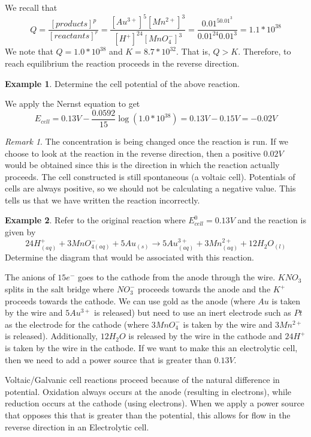 \documentclass[11pt]{article}
\theoremstyle{plain} %
\theoremstyle{definition}
\theoremstyle{example}
\newtheorem*{example}{Example}
\theoremstyle{remark}
\newtheorem*{remark}{Remark}
\begin{document}
We recall that $$Q = \frac{[products]^p}{[reactants]^r} = \frac{\left[Au^{3+}\right]^5\left[Mn^{2+}\right]^3}{\left[H^{+}\right]^{24}\left[MnO_4^-\right]^3} = \frac{0.01^50.01^3}{0.01^{24} 0.01^3} = 1.1*10^{38}$$
We note that $Q  = 1.0*10^{38}$ and $K = 8.7*10^{32}$. That is, $Q > K$. Therefore, to reach equilibrium the reaction proceeds in the reverse direction. 

\begin{example}
Determine the cell potential of the above reaction. 
\end{example}
We apply the Nernst equation to get $$E_{cell} =0.13V - \frac{0.0592}{15}\log(1.0*10^{38}) = 0.13V-0.15V = -0.02V$$

\begin{remark}The concentration is being changed once the reaction is run. If we choose to look at the reaction in the reverse direction, then a positive $0.02V$ would be obtained since this is the direction in which the reaction actually proceeds. The cell constructed is still spontaneous (a voltaic cell). Potentials of cells are always positive, so we should not be calculating a negative value. This tells us that we have written the reaction incorrectly. 
\end{remark}

\begin{example}
Refer to the original reaction where $E_{cell}^0 = 0.13V$ and the reaction is given by $$24H_{(aq)}^+ + 3MnO_{4(aq)}^- + 5Au_{(s)} \rightarrow 5Au_{(aq)}^{3+} + 3Mn_{(aq)}^{2+} + 12H_2O_{(l)}$$
Determine the diagram that would be associated with this reaction. 
\end{example}
The anions of $15e^-$ goes to the cathode from the anode through the wire. $KNO_3$ splits in the salt bridge where $NO_3^-$ proceeds towards the anode and the $K^+$ proceeds towards the cathode. We can use gold as the anode (where $Au$ is taken by the wire and $5Au^{3+}$ is released) but need to use an inert electrode such as $Pt$ as the electrode for the cathode (where $3MnO_4^-$ is taken by the wire and $3Mn^{2+}$ is released). Additionally, $12H_2O$ is released by the wire in the cathode and $24H^+$ is taken by the wire in the cathode. If we want to make this an electrolytic cell, then we need to add a power source that is greater than $0.13 V$.

Voltaic/Galvanic cell reactions proceed because of the natural difference in potential. Oxidation always occurs at the anode (resulting in electrons), while reduction occurs at the cathode (using electrons). When we apply a power source that opposes this that is greater than the potential, this allows for flow in the reverse direction in an Electrolytic cell. 
\end{document}
